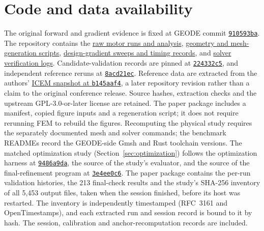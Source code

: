 \documentclass{anvil-paper}
\begin{document}
\section*{Code and data availability}
The original forward and gradient evidence is fixed at GEODE commit
\href{https://github.com/rjwalters/geode-fem/tree/910593bad6f64f9f01671c2632b57034e72b9c61}{\texttt{910593ba}}.
The repository contains the
\href{https://github.com/rjwalters/geode-fem/tree/910593bad6f64f9f01671c2632b57034e72b9c61/benchmarks/motor_reference/forward_harmonic}{raw motor runs and analysis},
\href{https://github.com/rjwalters/geode-fem/tree/910593bad6f64f9f01671c2632b57034e72b9c61/benchmarks/motor_reference/geometry}{geometry and mesh-generation scripts},
\href{https://github.com/rjwalters/geode-fem/tree/910593bad6f64f9f01671c2632b57034e72b9c61/benchmarks/motor_shape_gradient/design}{design-gradient sweeps and timing records},
and \href{https://github.com/rjwalters/geode-fem/tree/910593bad6f64f9f01671c2632b57034e72b9c61/benchmarks/motor_nonlinear_m1}{solver verification logs}.
Candidate-validation records are pinned at
\href{https://github.com/rjwalters/geode-fem/tree/224332c526be1191183af82b610973c7778de720/benchmarks/motor_validation}{\texttt{224332c5}},
and independent reference reruns at
\href{https://github.com/rjwalters/geode-fem/tree/8acd21ecf85d89fe077275a3c04ca70b53963d43/benchmarks/motor_reference/reference_refinement}{\texttt{8acd21ec}}.
Reference data are extracted from the authors'
\href{https://github.com/MichaelWiesheu/ICEMsnapshot/tree/b145aaf4ab1a6424828bc941eaf172f48fa0d458}{ICEM snapshot at \texttt{b145aaf4}},
a later repository revision rather than a claim to the original conference
release. Source hashes, extraction checks and the upstream GPL-3.0-or-later license
are retained. The paper package includes a manifest, copied figure inputs
and a regeneration script; it does not require rerunning FEM to rebuild
the figures. Recomputing the physical study requires the separately
documented mesh and solver commands; the benchmark READMEs record the
GEODE-side Gmsh and Rust toolchain versions.
The matched optimization study (Section~\ref{sec:optimization}) follows the
optimization harness at
\href{https://github.com/rjwalters/geode-fem/tree/9486a9da58beeca91968d4d3608f06b998abff45/benchmarks/motor_optimization}{\texttt{9486a9da}},
the source of the study's evaluator, and the source of the
final-refinement program at
\href{https://github.com/rjwalters/geode-fem/tree/3e4ee0c63a86dbf014a76c9faf04dd962da16911/crates/geode-core/examples/icem_final_refinement.rs}{\texttt{3e4ee0c6}}.
The paper package contains the per-run validation histories, the 213
final-check results and the study's SHA-256 inventory of all 5,453 output
files, taken when the session finished, before its host was restarted.
The inventory is independently timestamped (RFC~3161 and OpenTimestamps),
and each extracted run and session record is bound to it by hash. The
session, calibration and anchor-recomputation records are included.
\end{document}
